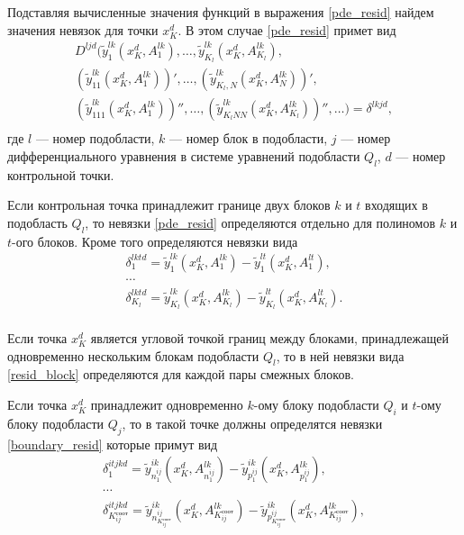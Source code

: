 \documentclass[a4paper,12pt]{article}
\begin{document}
Подставляя вычисленные значения функций в выражения \eqref{pde_resid}
найдем значения невязок для точки $x^d_K$. В этом случае
\eqref{pde_resid} примет вид
\begin{equation}
    \begin{array}{cc}
        D^{ljd}(\tilde{y}^{lk}_1(x^d_K, A^{lk}_1),\ldots,
                \tilde{y}^{lk}_{K_l}(x^d_K, A^{lk}_{K_l}),\\
        (\tilde{y}^{lk}_{11}(x^d_K, A^{lk}_1))',\ldots,
        (\tilde{y}^{lk}_{K_l,N}(x^d_K, A^{lk}_N))',\\
        (\tilde{y}^{lk}_{111}(x^d_K, A^{lk}_1))'',\ldots,
        (\tilde{y}^{lk}_{K_lNN}(x^d_K, A^{lk}_{K_l}))'',\ldots) 
        = \delta^{lkjd},\\
    \end{array}
    \label{cp_pde_resid}
\end{equation}
где $l$ --- номер подобласти, $k$ --- номер блок в подобласти, $j$ ---
номер дифференциального уравнения в системе уравнений подобласти
$Q_l$, $d$ --- номер контрольной точки.

Если контрольная точка принадлежит границе двух блоков $k$ и $t$
входящих в подобласть $Q_l$, то невязки \eqref{pde_resid} определяются
отдельно для полиномов $k$ и $t$-ого блоков. Кроме того определяются
невязки вида
\begin{equation}
    \begin{array}{ll}
        \delta^{lktd}_1 = \tilde{y}^{lk}_1(x^d_K, A^{lk}_1) -
        \tilde{y}^{lt}_1(x^d_K, A^{lt}_1),\\
        \cdots\\
        \delta^{lktd}_{K_l} = \tilde{y}^{lk}_{K_l}(x^d_K, A^{lk}_{K_l}) -
        \tilde{y}^{lt}_{K_l}(x^d_K, A^{lt}_{K_l}).\\
    \end{array}
    \label{resid_block}
\end{equation}

Если точка $x^d_K$ является угловой точкой границ между блоками,
принадлежащей одновременно нескольким блокам подобласти $Q_l$, то в
ней невязки вида \eqref{resid_block} определяются для каждой пары
смежных блоков.

Если точка $x^d_K$ принадлежит одновременно $k$-ому блоку подобласти
$Q_i$ и $t$-ому блоку подобласти $Q_j$, то в такой точке должны
определятся невязки \eqref{boundary_resid} которые примут вид
\begin{equation}
    \begin{array}{ll}
        \delta^{itjkd}_1 = 
        \tilde{y}^{ik}_{n^{ij}_1}
            (x^d_K, A^{lk}_{n^{ij}_1}) 
        - \tilde{y}^{ik}_{p^{ij}_1}
            (x^d_K, A^{lk}_{p^{ij}_1}), \\
        \cdots \\
        \delta^{itjkd}_{K^{соот}_{ij}} =
        \tilde{y}^{ik}_{n^{ij}_{K^{соот}_{ij}}}
            (x^d_K, A^{lk}_{K^{соот}_{ij}}) 
        - \tilde{y}^{ik}_{p^{ij}_{K^{соот}_{ij}}}
            (x^d_K, A^{lk}_{K^{соот}_{ij}}), \\
    \end{array}
    \label{cp_boundary_resid}
\end{equation}
\end{document}
